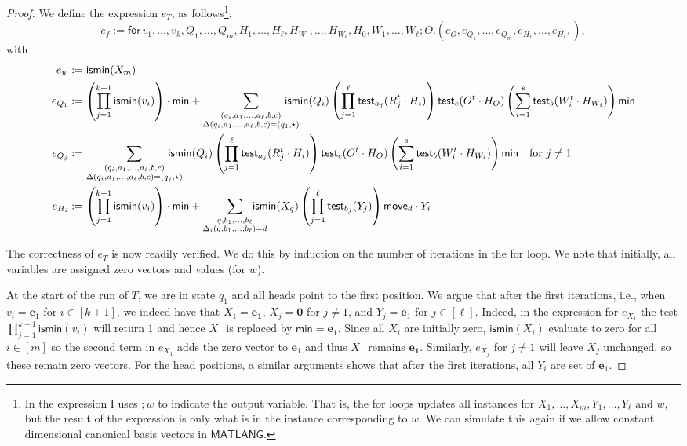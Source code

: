 \begin{proof}
We define the expression $e_T$, as follows\footnote{In the expression I uses $;w$ to indicate the output variable. That is, the for loops updates all instances for $X_1,\ldots,X_m,Y_1,\ldots,Y_\ell$ and $w$, but the result of the expression is only what is in the instance corresponding to $w$. We can simulate this again if we allow constant dimensional canonical basis vectors in $\mathsf{MATLANG}$.}:
$$
e_f:= \mathsf{for\,} v_1,\ldots,v_{k},Q_1,\ldots,Q_m,H_1,\ldots,H_\ell,H_{W_1},\ldots,H_{W_\ell},H_0, W_1,\ldots,W_\ell; O.(e_O,e_{Q_1},\ldots,e_{Q_m},e_{H_1},\ldots,e_{H_\ell},),
$$
with 
\begin{align*}\allowdisplaybreaks
	e_w&:=\mathsf{ismin}(X_m)\\
	e_{Q_1}&:=\left(\prod_{j=1}^{k+1} \textsf{ismin}(v_i)\right)\cdot\mathsf{min}
	+ \sum_{\substack{(q_i,a_1,\ldots,a_\ell,b,c)\\
	\Delta(q_i,a_1,\ldots,a_\ell,b,c)=(q_1,\star)}} \!\!\!\!\!\!\!\!\! \textsf{ismin}(Q_i)\left(\prod_{j=1}^\ell \mathsf{test}_{a_j}(R_j^t\cdot H_i)\right)\mathsf{test}_{c}(O^t\cdot H_O)
	\left(\sum_{i=1}^s \mathsf{test}_{b}(W_i^t\cdot H_{W_i})\right)\mathsf{min}\\
	e_{Q_j}&:=\sum_{\substack{(q_i,a_1,\ldots,a_\ell,b,c)\\
	\Delta(q_i,a_1,\ldots,a_\ell,b,c)=(q_j,\star)}} \!\!\!\!\!\!\!\!\! \textsf{ismin}(Q_i)\left(\prod_{j=1}^\ell \mathsf{test}_{a_j}(R_j^t\cdot H_i)\right)\mathsf{test}_{c}(O^t\cdot H_O)
	\left(\sum_{i=1}^s \mathsf{test}_{b}(W_i^t\cdot H_{W_i})\right)\mathsf{min}
	 \quad \text{for $j\neq 1$}\\
	e_{H_i}&:=\left(\prod_{j=1}^{k+1} \textsf{ismin}(v_i)\right)\cdot\mathsf{min}
	+\sum_{\substack{q,b_1,\ldots,b_\ell\\
	\Delta_i(q,b_1,\ldots,b_\ell)=d}}\!\!\!\!\!\!\!\!\! \textsf{ismin}(X_q)\left(\prod_{j=1}^\ell \mathsf{test}_{b_j}(Y_j)\right)\mathsf{move}_d\cdot Y_i
\end{align*}

The correctness of $e_T$ is now readily verified. We do this by induction on the number of iterations in the for loop. We note that initially, all variables are assigned zero vectors and values (for $w$). 

At the start of the run of $T$, we are in state $q_1$ and all heads point to the first position. We argue that after the first 
iterations, i.e., when $v_i=\mathbf{e}_1$ for $i\in[k+1]$, we indeed have that $X_1=\mathbf{e_1}$, $X_j=\mathbf{0}$ for $j\neq 1$, and $Y_j=\mathbf{e}_1$ for $j\in[\ell]$. Indeed, in the expression for $e_{X_1}$ the test $\prod_{j=1}^{k+1} \textsf{ismin}(v_i)$ will return $1$ and hence $X_1$ is replaced by $\mathsf{min}=\mathbf{e}_1$. Since all $X_i$ are initially zero, $\mathsf{ismin}(X_i)$ evaluate to zero for all $i\in[m]$ so the second term in $e_{X_1}$ adds the zero vector to $\mathbf{e}_1$ and thus $X_1$ remains $\mathbf{e_1}$.
Similarly, $e_{X_j}$ for $j\neq 1$ will leave $X_j$ unchanged, so these remain zero vectors. For the head positions, a similar arguments shows that after the first iterations, all $Y_i$ are set of $\mathbf{e}_1$.


\end{proof}

